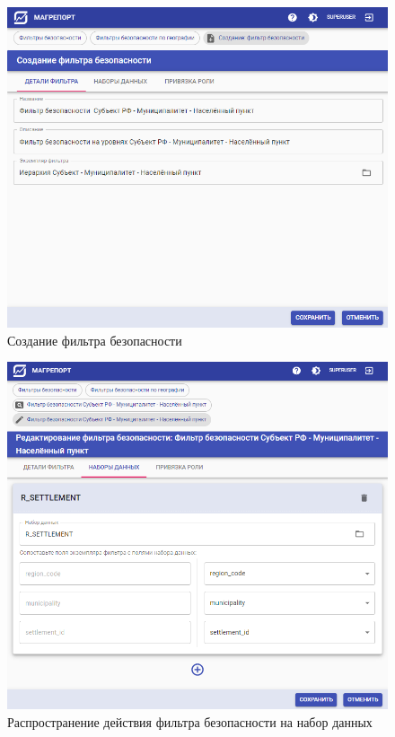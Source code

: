 \documentclass[../user-manual.tex]{subfiles}
\begin{document}
	\begin{figure}[h]
		\centering
		\includegraphics[width=\graphicswidth]{img/12-sf-create.png}
		\caption{Создание фильтра безопасности}
		\label{fig:sf-create}
	\end{figure}

	\begin{figure}[h]
		\centering
		\includegraphics[width=\graphicswidth]{img/13-bind-sf-to-dataset.png}
		\caption{Распространение действия фильтра безопасности на набор данных}
		\label{fig:bind-sf-to-dataset}
	\end{figure}
\end{document}
